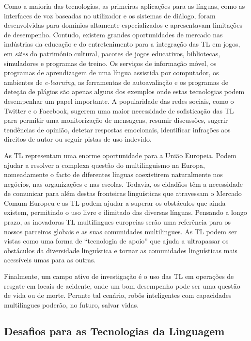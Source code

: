 \documentclass[]{../metanetpaper}
\begin{document}
\begin{multicols}{2}
Como a maioria das tecnologias, as primeiras aplicações para as línguas, como as interfaces de voz baseadas no utilizador e os sistemas de diálogo, foram desenvolvidas para domínios altamente especializados e apresentavam limitações de desempenho. Contudo, existem grandes oportunidades de mercado nas indústrias da educação e do entretenimento para a integração das TL em jogos, em \textit{sites} do património cultural, pacotes de jogos e\-du\-ca\-ti\-vos, bibliotecas, simuladores e programas de treino. Os serviços de informação móvel, os programas de aprendizagem de uma língua assistida por computador, os ambientes de \textit{e-learning}, as ferramentas de autoavaliação e os programas de deteção de plágios são apenas alguns dos exemplos onde estas tecnologias podem desempenhar um papel importante. A popularidade das redes sociais, como o Twitter e o Facebook, sugerem uma maior necessidade de sofisticação das TL para permitir uma monitorização de mensagens, resumir discussões, sugerir tendências de opinião, detetar respostas emocionais, identificar infrações aos direitos de autor ou seguir pistas de uso indevido.


As TL representam uma enorme oportunidade para a União Europeia. Podem ajudar a resolver a complexa questão do multilinguismo na Europa, nomeadamente o facto de diferentes línguas coexistirem naturalmente nos negócios, nas organizações e nas escolas. Todavia, os cidadãos têm a necessidade de comunicar para além destas fronteiras linguísticas que atravessam o Mercado Comum Europeu e as TL podem ajudar a superar os obstáculos que ainda existem, permitindo o uso livre e ilimitado das diversas línguas. Pensando a longo prazo, as inovadoras TL multilingues europeias serão uma referência para os nossos parceiros globais e as suas comunidades multilingues. As TL podem ser vistas como uma forma de “tecnologia de apoio” que ajuda a ultrapassar os obstáculos da diversidade linguística e tornar as comunidades linguísticas mais acessíveis umas para as outras.

Finalmente, um campo ativo de investigação é o uso das TL em operações de resgate em locais de acidente, onde um bom desempenho pode ser uma questão de vida ou de morte. Perante tal cenário, robôs inteligentes com capacidades multilingues poderão, no futuro, salvar vidas.

\subsection{Desafios para as Tecnologias da Linguagem}


\end{multicols}
\end{document}
